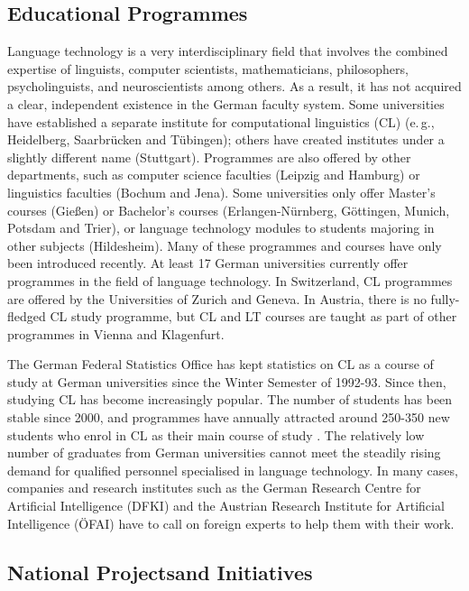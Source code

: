 \documentclass[]{../../metanetpaper}
\begin{document}
\begin{multicols}{2}
\subsection{Educational Programmes}

Language technology is a very interdisciplinary field that involves the combined expertise of linguists, computer scientists, mathematicians, philosophers, psycholinguists, and neuroscientists among others. As a result, it has not acquired a clear, independent existence in the German faculty system. Some universities have established a separate institute for computational linguistics (CL) (e.\,g., Heidelberg, Saarbrücken and Tübingen); others have created institutes under a slightly different name (Stuttgart). Programmes are also offered by other departments, such as computer science faculties (Leipzig and Hamburg) or linguistics faculties (Bochum and Jena). Some universities only offer Master’s courses (Gießen) or Bachelor’s courses (Erlangen-Nürnberg, Göttingen, Munich, Potsdam and Trier), or language technology modules to students majoring in other subjects (Hildesheim). Many of these programmes and courses have only been introduced recently. At least 17 German universities currently offer programmes in the field of language technology. In Switzerland, CL programmes are offered by the Universities of Zurich and Geneva. In Austria, there is no fully-fledged CL study programme, but CL and LT courses are taught as part of other programmes in Vienna and Klagenfurt.

The German Federal Statistics Office has kept statistics on CL as a course of study at German universities since the Winter Semester of 1992-93. Since then, studying CL has become increasingly popular. The number of students has been stable since 2000, and programmes have annually attracted around 250-350 new students who enrol in CL as their main course of study \cite{wie1}. The relatively low number of graduates from German universities cannot meet the steadily rising demand for qualified personnel specialised in language technology. In many cases, companies and research institutes such as the German Research Centre for Artificial Intelligence (DFKI) and the Austrian Research Institute for Artificial Intelligence (ÖFAI) have to call on foreign experts to help them with their work.

\subsection[National Projects and Initiatives]{National Projects\newline and Initiatives}


\end{multicols}
\end{document}
